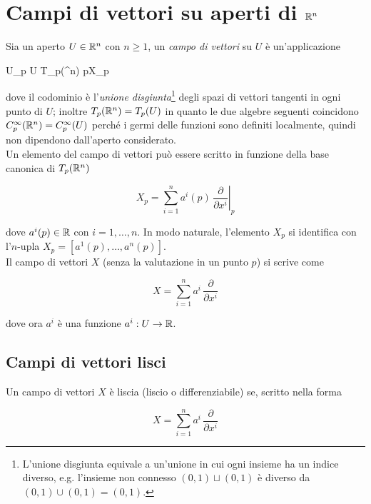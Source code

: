\section{Campi di vettori su aperti di $ \mathbb{R}^{n} $}

Sia un aperto $ U \in \mathbb{R}^{n} $ con $ n \geqslant 1 $, un \textit{campo di vettori} su $ U $ è un'applicazione

	{U}{\bigsqcup_{p \in U} T_{p}(\R^{n})}
	{p}{X_{p}}

dove il codominio è l'\textit{unione disgiunta}\footnote{%
	L'unione disgiunta equivale a un'unione in cui ogni insieme ha un indice diverso, e.g. l'insieme non connesso $ (0,1) \sqcup (0,1) $ è diverso da $ (0,1) \cup (0,1) = (0,1) $.%
} degli spazi di vettori tangenti in ogni punto di $ U $; inoltre $ T_{p}(\mathbb{R}^{n}) = T_{p}(U) $ in quanto le due algebre seguenti coincidono $ C_{p}^{\infty}(\mathbb{R}^{n}) = C_{p}^{\infty}(U) $ perché i germi delle funzioni sono definiti localmente, quindi non dipendono dall'aperto considerato.\\
Un elemento del campo di vettori può essere scritto in funzione della base canonica di $ T_{p}(\mathbb{R}^{n}) $

\begin{equation}
	X_{p} = \sum_{i=1}^{n} a^{i}(p) \, \left. \dfrac{\partial}{\partial x^{i}} \right|_{p}
\end{equation}

dove $ a^{i}(p) \in \mathbb{R} $ con $ i=1,\dots,n $. In modo naturale, l'elemento $ X_{p} $ si identifica con l'$ n $-upla $ X_{p} = [a^{1}(p),\dots,a^{n}(p)] $.\\
Il campo di vettori $ X $ (senza la valutazione in un punto $ p $) si scrive come

\begin{equation}
	X = \sum_{i=1}^{n} a^{i} \, \dfrac{\partial}{\partial x^{i}}
\end{equation}

dove ora $ a^{i} $ è una funzione $ a^{i} : U \to \mathbb{R} $.

\subsection{Campi di vettori lisci}

Un campo di vettori $ X $ è liscia (liscio o differenziabile) se, scritto nella forma

\begin{equation}
	X = \sum_{i=1}^{n} a^{i} \, \dfrac{\partial}{\partial x^{i}}
\end{equation}

